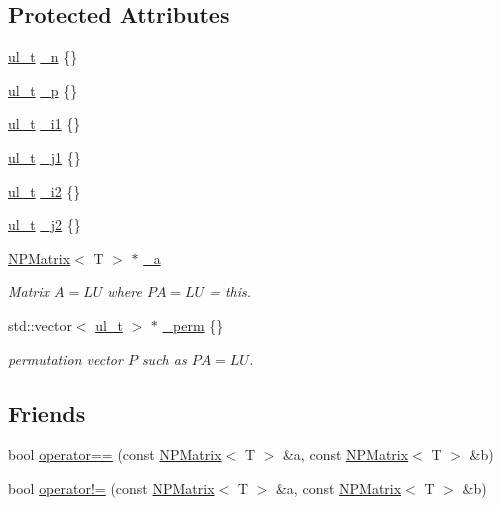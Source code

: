 \subsection*{Protected Attributes}
\begin{DoxyCompactItemize}
\item 
\mbox{\hyperlink{group___n_algebra_ga1b140a2034db3f5dfe18a987745df43a}{ul\+\_\+t}} \mbox{\hyperlink{class_n_p_matrix_a6ead143a6f35fc3247c26c2442841ba9}{\+\_\+n}} \{\}
\item 
\mbox{\hyperlink{group___n_algebra_ga1b140a2034db3f5dfe18a987745df43a}{ul\+\_\+t}} \mbox{\hyperlink{class_n_p_matrix_aa1571de5d091b0b2e71fd665da3eb7e1}{\+\_\+p}} \{\}
\item 
\mbox{\hyperlink{group___n_algebra_ga1b140a2034db3f5dfe18a987745df43a}{ul\+\_\+t}} \mbox{\hyperlink{class_n_p_matrix_a0cae48bb6660c2d00136ce8600d0fc28}{\+\_\+i1}} \{\}
\item 
\mbox{\hyperlink{group___n_algebra_ga1b140a2034db3f5dfe18a987745df43a}{ul\+\_\+t}} \mbox{\hyperlink{class_n_p_matrix_aa95383d682a70d44dc268164c46c2e1f}{\+\_\+j1}} \{\}
\item 
\mbox{\hyperlink{group___n_algebra_ga1b140a2034db3f5dfe18a987745df43a}{ul\+\_\+t}} \mbox{\hyperlink{class_n_p_matrix_a232044cf8aba4ad59c69c465822aed59}{\+\_\+i2}} \{\}
\item 
\mbox{\hyperlink{group___n_algebra_ga1b140a2034db3f5dfe18a987745df43a}{ul\+\_\+t}} \mbox{\hyperlink{class_n_p_matrix_ad5307914390ebfd2e7760146bd10d8d4}{\+\_\+j2}} \{\}
\item 
\mbox{\hyperlink{class_n_p_matrix}{N\+P\+Matrix}}$<$ T $>$ $\ast$ \mbox{\hyperlink{class_n_p_matrix_aef296b7e9a4688acd83e0cf2d9e5dfef}{\+\_\+a}}
\begin{DoxyCompactList}\small\item\em Matrix $ A = LU $ where $ PA = LU $ = this. \end{DoxyCompactList}\item 
std\+::vector$<$ \mbox{\hyperlink{group___n_algebra_ga1b140a2034db3f5dfe18a987745df43a}{ul\+\_\+t}} $>$ $\ast$ \mbox{\hyperlink{class_n_p_matrix_adae969b094e97895a62412765b50fb6f}{\+\_\+perm}} \{\}
\begin{DoxyCompactList}\small\item\em permutation vector $ P $ such as $ PA = LU $. \end{DoxyCompactList}\end{DoxyCompactItemize}
\subsection*{Friends}
\begin{DoxyCompactItemize}
\item 
bool \mbox{\hyperlink{class_n_p_matrix_a8b906fe5547a2234430316ccfed4b98a}{operator==}} (const \mbox{\hyperlink{class_n_p_matrix}{N\+P\+Matrix}}$<$ T $>$ \&a, const \mbox{\hyperlink{class_n_p_matrix}{N\+P\+Matrix}}$<$ T $>$ \&b)
\item 
bool \mbox{\hyperlink{class_n_p_matrix_a04301fcca6baa720c7a10c61bdee2645}{operator!=}} (const \mbox{\hyperlink{class_n_p_matrix}{N\+P\+Matrix}}$<$ T $>$ \&a, const \mbox{\hyperlink{class_n_p_matrix}{N\+P\+Matrix}}$<$ T $>$ \&b)
\end{DoxyCompactItemize}
